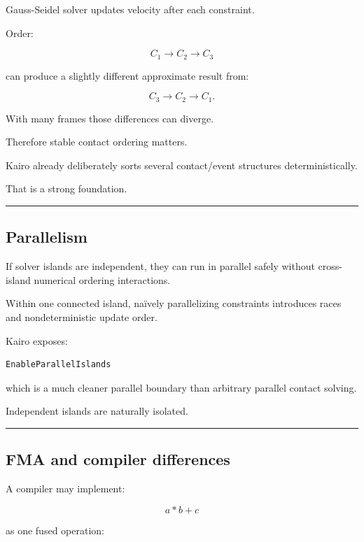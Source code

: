 Gauss-Seidel solver updates velocity after each constraint.

Order:

\[
C_1\rightarrow C_2\rightarrow C_3
\]

can produce a slightly different approximate result from:

\[
C_3\rightarrow C_2\rightarrow C_1.
\]

With many frames those differences can diverge.

Therefore stable contact ordering matters.

Kairo already deliberately sorts several contact/event structures deterministically.

That is a strong foundation.

\begin{center}\rule{0.5\linewidth}{0.5pt}\end{center}

\subsection{Parallelism}\label{06-engine-ii-ch039-parallelism}

If solver islands are independent, they can run in parallel safely without cross-island numerical ordering interactions.

Within one connected island, naïvely parallelizing constraints introduces races and nondeterministic update order.

Kairo exposes:

\begin{verbatim}
EnableParallelIslands
\end{verbatim}

which is a much cleaner parallel boundary than arbitrary parallel contact solving.

Independent islands are naturally isolated.

\begin{center}\rule{0.5\linewidth}{0.5pt}\end{center}

\subsection{FMA and compiler differences}\label{06-engine-ii-ch039-fma-and-compiler-differences}

A compiler may implement:

\[
a*b+c
\]

as one fused operation:

